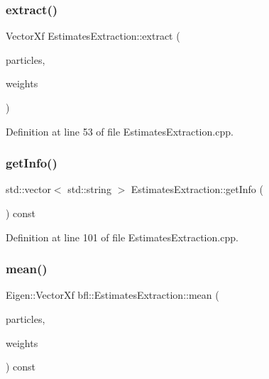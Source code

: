 \mbox{\label{classbfl_1_1EstimatesExtraction_a62d6fe7e504087183ab0b4bb62e214d4}} 
\subsubsection{\texorpdfstring{extract()}{extract()}}
{\footnotesize\ttfamily Vector\+Xf Estimates\+Extraction\+::extract (\begin{DoxyParamCaption}\item[{const Eigen\+::\+Ref$<$ const Eigen\+::\+Matrix\+Xf $>$ \&}]{particles,  }\item[{const Eigen\+::\+Ref$<$ const Eigen\+::\+Vector\+Xf $>$ \&}]{weights }\end{DoxyParamCaption})}



Definition at line 53 of file Estimates\+Extraction.\+cpp.

\mbox{\label{classbfl_1_1EstimatesExtraction_a522ca7407979007a4199291a756486d6}} 
\subsubsection{\texorpdfstring{get\+Info()}{getInfo()}}
{\footnotesize\ttfamily std\+::vector$<$ std\+::string $>$ Estimates\+Extraction\+::get\+Info (\begin{DoxyParamCaption}{ }\end{DoxyParamCaption}) const}



Definition at line 101 of file Estimates\+Extraction.\+cpp.

\mbox{\label{classbfl_1_1EstimatesExtraction_a2398b14fd25bcf319b71a2a4b3472da1}} 
\subsubsection{\texorpdfstring{mean()}{mean()}}
{\footnotesize\ttfamily Eigen\+::\+Vector\+Xf bfl\+::\+Estimates\+Extraction\+::mean (\begin{DoxyParamCaption}\item[{const Eigen\+::\+Ref$<$ const Eigen\+::\+Matrix\+Xf $>$ \&}]{particles,  }\item[{const Eigen\+::\+Ref$<$ const Eigen\+::\+Vector\+Xf $>$ \&}]{weights }\end{DoxyParamCaption}) const\hspace{0.3cm}{\ttfamily [protected]}}

